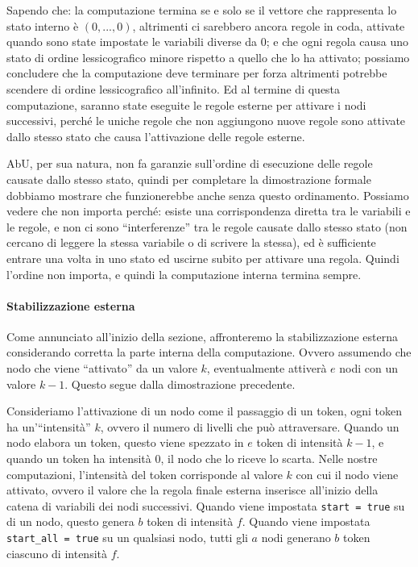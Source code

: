 \documentclass[target=bach]{thud}
\begin{document}
Sapendo che: la computazione termina se e solo se il vettore che rappresenta lo stato interno è $(0,...,0)$, altrimenti ci sarebbero ancora regole in coda, attivate quando sono state impostate le variabili diverse da $0$; e che ogni regola causa uno stato di ordine lessicografico minore rispetto a quello che lo ha attivato; possiamo concludere che la computazione deve terminare per forza altrimenti potrebbe scendere di ordine lessicografico all'infinito.
Ed al termine di questa computazione, saranno state eseguite le regole esterne per attivare i nodi successivi, perché le uniche regole che non aggiungono nuove regole sono attivate dallo stesso stato che causa l'attivazione delle regole esterne.

AbU, per sua natura, non fa garanzie sull'ordine di esecuzione delle regole causate dallo stesso stato, quindi per completare la dimostrazione formale dobbiamo mostrare che funzionerebbe anche senza questo ordinamento.
Possiamo vedere che non importa perché: esiste una corrispondenza diretta tra le variabili e le regole, e non ci sono ``interferenze'' tra le regole causate dallo stesso stato (non cercano di leggere la stessa variabile o di scrivere la stessa), ed è sufficiente entrare una volta in uno stato ed uscirne subito per attivare una regola.
Quindi l'ordine non importa, e quindi la computazione interna termina sempre.

\paragraph{Stabilizzazione esterna}

Come annunciato all'inizio della sezione, affronteremo la stabilizzazione esterna considerando corretta la parte interna della computazione. Ovvero assumendo che nodo che viene ``attivato'' da un valore $k$, eventualmente attiverà $e$ nodi con un valore $k-1$. Questo segue dalla dimostrazione precedente.

Consideriamo l'attivazione di un nodo come il passaggio di un token, ogni token ha un'``intensità'' $k$, ovvero il numero di livelli che può attraversare. Quando un nodo elabora un token, questo viene spezzato in $e$ token di intensità $k-1$, e quando un token ha intensità $0$, il nodo che lo riceve lo scarta.
Nelle nostre computazioni, l'intensità del token corrisponde al valore $k$ con cui il nodo viene attivato, ovvero il valore che la regola finale esterna inserisce all'inizio della catena di variabili dei nodi successivi. Quando viene impostata \lstinline{start = true} su di un nodo, questo genera $b$ token di intensità $f$. Quando viene impostata \lstinline{start_all = true} su un qualsiasi nodo, tutti gli $a$ nodi generano $b$ token ciascuno di intensità $f$.
\end{document}

